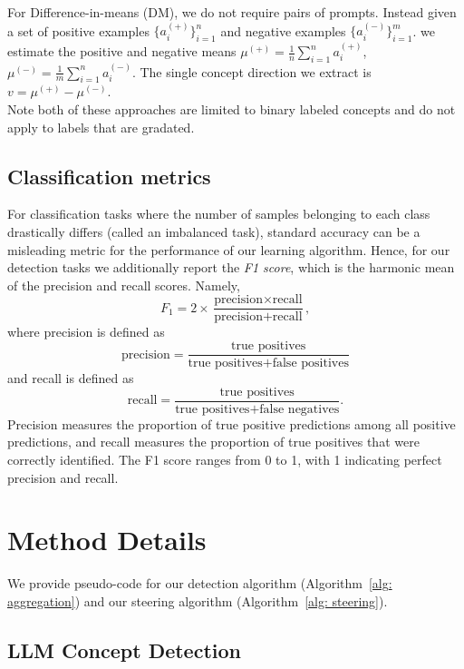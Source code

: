 For Difference-in-means (DM), we do not require pairs of prompts. Instead given a set of positive examples $\{a^{(+)}_i\}_{i=1}^n$ and negative examples $\{a^{(-)}_i\}_{i=1}^m$. we estimate the positive and negative means $\mu^{(+)} = \frac{1}{n} \sum_{i=1}^n a^{(+)}_i$, $\mu^{(-)} = \frac{1}{m} \sum_{i=1}^n a^{(-)}_i$. The single concept direction we extract is $v = \mu^{(+)} - \mu^{(-)}$.\\

\noindent Note both of these approaches are limited to binary labeled concepts and do not apply to labels that are gradated.

\subsection{Classification metrics}
\label{app: metrics}
For classification tasks where the number of samples belonging to each class drastically differs (called an imbalanced task), standard accuracy can be a misleading metric for the performance of our learning algorithm. Hence, for our detection tasks we additionally report the \textit{F1 score}, which is the harmonic mean of the precision and recall scores. Namely, 
$$F_1 = 2 \times \frac{\text{precision} \times \text{recall}}{\text{precision} + \text{recall}},$$ 
where precision is defined as $$\text{precision} = \frac{\text{true positives}}{\text{true positives} + \text{false positives}}$$ and recall is defined as 
$$\text{recall} = \frac{\text{true positives}}{\text{true positives} + \text{false negatives}}.$$ 
Precision measures the proportion of true positive predictions among all positive predictions, and recall measures the proportion of true positives that were correctly identified. The F1 score ranges from 0 to 1, with 1 indicating perfect precision and recall.

\section{Method Details}
\label{app: method details}

We provide pseudo-code for our detection algorithm (Algorithm~\ref{alg: aggregation}) and our steering algorithm (Algorithm~\ref{alg: steering}).

\subsection{LLM Concept Detection}
